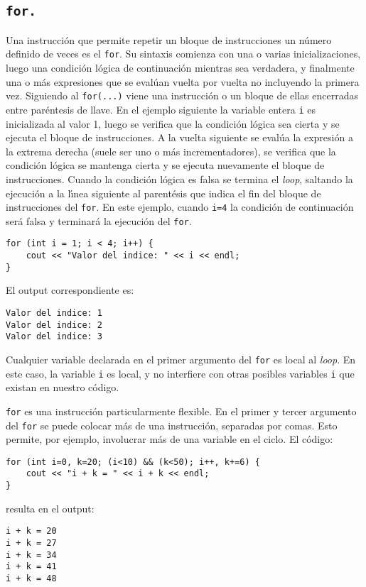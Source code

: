\subsection{\tt for.}

Una instrucci{\'o}n que permite repetir un bloque de instrucciones un
n{\'u}mero definido de veces es el \verb|for|. Su sintaxis comienza con
una o varias inicializaciones, luego una condici{\'o}n l{\'o}gica de
continuaci{\'o}n mientras sea verdadera, y finalmente una o m{\'a}s
expresiones que se eval{\'u}an vuelta por vuelta no incluyendo la primera vez.
Siguiendo al \verb|for(...)| viene una instrucci{\'o}n o un bloque de
ellas encerradas entre par{\'e}ntesis de llave. En el ejemplo siguiente la
variable entera \verb|i| es inicializada al valor 1, luego se verifica
que la condici{\'o}n l{\'o}gica sea cierta y se ejecuta el bloque de
instrucciones. A la vuelta siguiente se eval{\'u}a la expresi{\'o}n a la
extrema derecha (suele ser uno o m{\'a}s incrementadores), se verifica que
la condici{\'o}n l{\'o}gica se mantenga cierta y se ejecuta nuevamente el
bloque de instrucciones.  Cuando la condici{\'o}n l{\'o}gica es falsa se
termina el {\it loop}, saltando la ejecuci{\'o}n a la l{\'\i}nea siguiente al
parent{\'e}sis que indica el fin del bloque de instrucciones del
\verb|for|. En este ejemplo, cuando \verb|i=4| la condici{\'o}n de
continuaci{\'o}n ser{\'a} falsa y terminar{\'a} la ejecuci{\'o}n del
\verb|for|. 
\begin{verbatim}
for (int i = 1; i < 4; i++) {
    cout << "Valor del indice: " << i << endl;
}
\end{verbatim}
El output correspondiente es:
\begin{verbatim}
Valor del indice: 1
Valor del indice: 2
Valor del indice: 3
\end{verbatim}

Cualquier variable declarada en el primer argumento del \verb+for+ es
local al {\it loop}. En este caso, la variable \verb+i+ es local, y no
interfiere con otras posibles variables \verb+i+ que existan en
nuestro c\'odigo.

\verb+for+ es una instrucci\'on particularmente flexible. En el primer
y tercer argumento del \verb+for+ se puede colocar m\'as de una
instrucci\'on, separadas por comas. Esto permite, por ejemplo, 
 involucrar m{\'a}s de una
variable en el 
ciclo. El c\'odigo:
\begin{verbatim}
for (int i=0, k=20; (i<10) && (k<50); i++, k+=6) {
    cout << "i + k = " << i + k << endl;
}
\end{verbatim}
resulta en el output:
\begin{verbatim}
i + k = 20
i + k = 27
i + k = 34
i + k = 41
i + k = 48
\end{verbatim}

